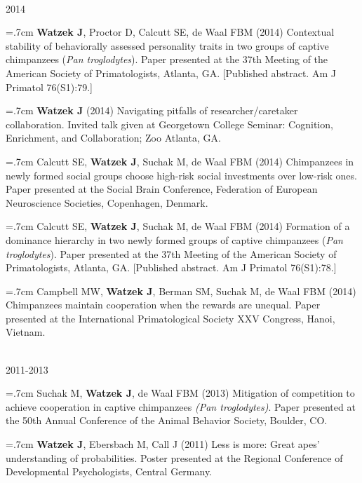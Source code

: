 \documentclass[]{friggeri-cv}
\begin{document}
{\large{} ~\\[-.15cm] 2014}

\hangindent=.7cm \textbf{Watzek J}, Proctor D, Calcutt SE, de Waal FBM (2014) Contextual stability of behaviorally assessed personality traits in two groups of captive chimpanzees (\emph{Pan troglodytes}). Paper presented at the 37th Meeting of the American Society of Primatologists, Atlanta, GA. [Published abstract. Am J Primatol 76(S1):79.]

\hangindent=.7cm \textbf{Watzek J} (2014) Navigating pitfalls of researcher/caretaker collaboration. Invited talk given at Georgetown College Seminar: Cognition, Enrichment, and Collaboration; Zoo Atlanta, GA.

\hangindent=.7cm Calcutt SE, \textbf{Watzek J}, Suchak M, de Waal FBM (2014) Chimpanzees in newly formed social groups choose high-risk social investments over low-risk ones. Paper presented at the Social Brain Conference, Federation of European Neuroscience Societies, Copenhagen, Denmark.

\hangindent=.7cm Calcutt SE, \textbf{Watzek J}, Suchak M, de Waal FBM (2014) Formation of a dominance hierarchy in two newly formed groups of captive chimpanzees (\emph{Pan troglodytes}). Paper presented at the 37th Meeting of the American Society of Primatologists, Atlanta, GA. [Published abstract. Am J Primatol 76(S1):78.]

\hangindent=.7cm Campbell MW, \textbf{Watzek J}, Berman SM, Suchak M, de Waal FBM (2014) Chimpanzees maintain cooperation when the rewards are unequal. Paper presented at the International Primatological Society XXV Congress, Hanoi, Vietnam.


{\large{} ~\\[-.15cm] 2011-2013}

\hangindent=.7cm Suchak M, \textbf{Watzek J}, de Waal FBM (2013) Mitigation of competition to achieve cooperation in captive chimpanzees \emph{(Pan troglodytes)}. Paper presented at the 50th Annual Conference of the Animal Behavior Society, Boulder, CO.

\hangindent=.7cm \textbf{Watzek J}, Ebersbach M, Call J (2011) Less is more: Great apes' understanding of probabilities. Poster presented at the Regional Conference of Developmental Psychologists, Central Germany.\\[-.1cm]
\end{document}
